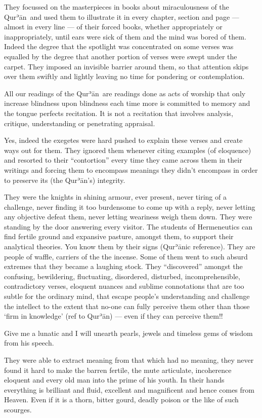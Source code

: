 \documentclass[12pt]{memoir}
\def\´{ʾ} %
\def \Quran{Qur\-\´ān} %
\begin{document}
They focussed on the masterpieces in books about miraculousness of the \Quran\
and used them to illustrate it in every chapter, section and page —
almost in every line — of their forced books,
whether appropriately or inappropriately,
until ears were sick of them and the mind was bored of them.
Indeed the degree that the spotlight was concentrated on some verses
was equalled by the degree that another portion of verses
were swept under the carpet.
They imposed an invisible barrier around them,
so that attention skips over them swiftly and lightly
leaving no time for pondering or contemplation.

All our readings of the \Quran\ are readings done as acts of worship
that only increase blindness upon blindness each time more
is committed to memory and the tongue perfects recitation.
It is not a recitation that involves analysis, critique,
understanding or penetrating appraisal.

Yes, indeed the exegetes were hard pushed to explain these verses
and create ways out for them.
They ignored them whenever citing examples (of eloquence)
and resorted to their “contortion” every time they came across them
in their writings and forcing them to encompass meanings
they didn’t encompass in order to preserve its (the \Quran’s) integrity.

They were the knights in shining armour, ever present,
never tiring of a challenge,
never finding it too burdensome to come up with a reply,
never letting any objective defeat them,
never letting weariness weigh them down.
They were standing by the door answering every visitor.
The students of Hermeneutics can find fertile ground and expansive pasture,
amongst them, to support their analytical theories.
You know them by their signs (\Quran{}ic reference).
They are people of waffle, carriers of the the incense.
Some of them went to such absurd extremes that they became a laughing stock.
They “discovered” amongst the confusing, bewildering, fluctuating, disordered,
disturbed, incomprehensible, contradictory verses, eloquent nuances
and sublime connotations that are too subtle for the ordinary mind,
that escape people’s understanding and challenge the intellect to the extent
that no-one can fully perceive them other than those ‘firm in knowledge’
(ref to \Quran) — even if they can perceive them!!

Give me a lunatic and I will unearth pearls, jewels
and timeless gems of wisdom from his speech.

They were able to extract meaning from that which had no meaning,
they never found it hard to make the barren fertile,
the mute articulate, incoherence eloquent
and every old man into the prime of his youth.
In their hands everything is brilliant and fluid,
excellent and magnificent and hence comes from Heaven.
Even if it is a thorn, bitter gourd,
deadly poison or the like of such scourges.
\end{document}
